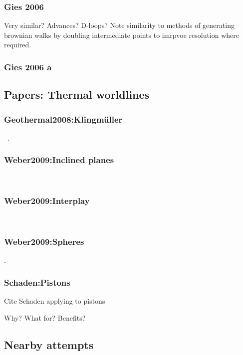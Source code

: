 \subsubsection{Gies 2006}
\cite{Gies2006}

Very similar?  Advances?  
D-loops?  Note similarity to methods of generating brownian walks by doubling intermediate points to imrpvoe resolution where required.  

\subsubsection{Gies 2006 a}
\cite{Gies2006a}

\subsection{Papers: Thermal worldlines}

\subsubsection{Geothermal2008:Klingm\"uller}
~\cite{Klingmueller2008}.  
\subsubsection{Weber2009:Inclined planes}
~\cite{Weber2009}
\subsubsection{Weber2009:Interplay}
~\cite{Weber2010}
\subsubsection{Weber2009:Spheres}
\cite{Weber2010a}.  

\subsubsection{Schaden:Pistons}

Cite Schaden applying to pistons\cite{Schaden2009}

Why?  What for?  Benefits?

\subsection{Nearby attempts}

\cite{Aehlig2011}

\cite{Maggs2006, Pasquali2008}

